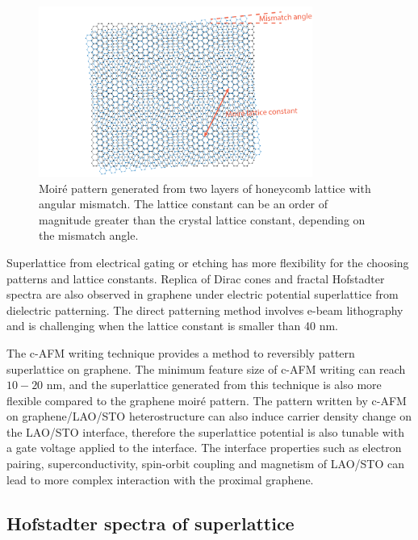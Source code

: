 \documentclass[pdflatex, sectionletters, 12pt, final, phd]{pittetd}    %
\begin{document}
\begin{figure}[h!]
	\centering
	\includegraphics[width=0.8\textwidth]{Drawing/Moire.pdf}
	\caption[Moir{\'e} pattern]{Moir{\'e} pattern generated from two layers of honeycomb lattice with angular mismatch. The lattice constant can be an order of magnitude greater than the crystal lattice constant, depending on the mismatch angle.}
	\label{FIG:Moire}
\end{figure}

Superlattice from electrical gating\cite{forsythe2018band} or etching\cite{jessen2019lithographic} has more flexibility for the choosing patterns and lattice constants. Replica of Dirac cones and fractal Hofstadter spectra are also observed in graphene under electric potential superlattice from dielectric patterning\cite{forsythe2018band}. The direct patterning method involves e-beam lithography and is challenging when the lattice constant is smaller than 40 nm.

The c-AFM writing technique provides a method to reversibly pattern superlattice on graphene. The minimum feature size of c-AFM writing can reach $10-20$ nm\cite{huang2015electric}, and the superlattice generated from this technique is also more flexible compared to the graphene moir{\'e} pattern. The pattern written by c-AFM on graphene/LAO/STO heterostructure can also induce carrier density change on the LAO/STO interface\cite{huang2015electric}, therefore the superlattice potential is also tunable with a gate voltage applied to the interface. The interface properties such as electron pairing\cite{cheng2015electron}, superconductivity\cite{reyren2007superconducting}, spin-orbit coupling\cite{caviglia2010tunable, zhong2013theory} and magnetism\cite{bi2014room} of LAO/STO can lead to more complex interaction with the proximal graphene.

\subsection{Hofstadter spectra of superlattice}
\end{document}
